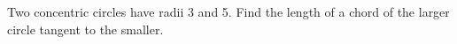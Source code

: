 Two concentric circles have radii 3 and 5. Find the length of a chord of the larger circle tangent to the smaller.
